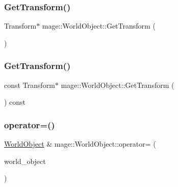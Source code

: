 \hypertarget{classmage_1_1_world_object_a4add48c19a884f5feaddc202c8266e9d}{}\label{classmage_1_1_world_object_a4add48c19a884f5feaddc202c8266e9d} 
\subsubsection{\texorpdfstring{Get\+Transform()}{GetTransform()}\hspace{0.1cm}{\footnotesize\ttfamily [1/2]}}
{\footnotesize\ttfamily Transform$\ast$ mage\+::\+World\+Object\+::\+Get\+Transform (\begin{DoxyParamCaption}{ }\end{DoxyParamCaption})}

\hypertarget{classmage_1_1_world_object_a15517a1962c5eb33de5fd3da4b4afe12}{}\label{classmage_1_1_world_object_a15517a1962c5eb33de5fd3da4b4afe12} 
\subsubsection{\texorpdfstring{Get\+Transform()}{GetTransform()}\hspace{0.1cm}{\footnotesize\ttfamily [2/2]}}
{\footnotesize\ttfamily const Transform$\ast$ mage\+::\+World\+Object\+::\+Get\+Transform (\begin{DoxyParamCaption}{ }\end{DoxyParamCaption}) const}

\hypertarget{classmage_1_1_world_object_a0676dc2fde5791becae9547077c7db0c}{}\label{classmage_1_1_world_object_a0676dc2fde5791becae9547077c7db0c} 
\subsubsection{\texorpdfstring{operator=()}{operator=()}\hspace{0.1cm}{\footnotesize\ttfamily [1/2]}}
{\footnotesize\ttfamily \hyperlink{classmage_1_1_world_object}{World\+Object} \& mage\+::\+World\+Object\+::operator= (\begin{DoxyParamCaption}\item[{const \hyperlink{classmage_1_1_world_object}{World\+Object} \&}]{world\+\_\+object }\end{DoxyParamCaption})}

